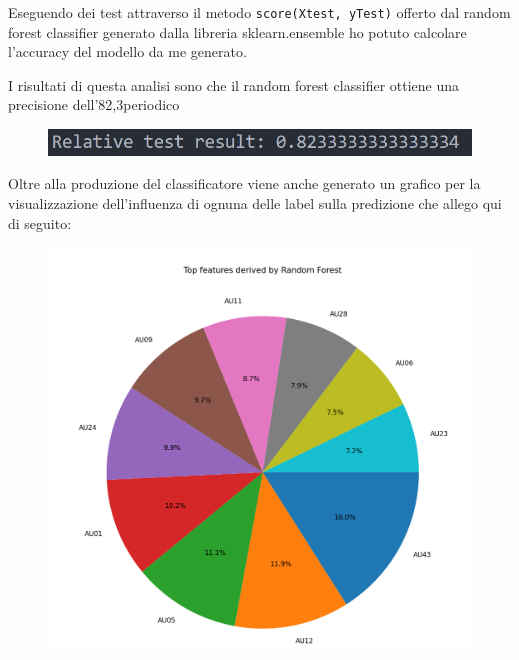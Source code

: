 Eseguendo dei test attraverso il metodo \texttt{score(Xtest, yTest)} offerto dal random forest classifier generato dalla libreria sklearn.ensemble ho potuto calcolare l’accuracy del modello da me generato.

I risultati di questa analisi sono che il random forest classifier ottiene una precisione dell’82,3periodico%

\begin{figure}
    \begin{center}    
        \includegraphics[width=0.9\linewidth]{images/image36.png}
    \end{center}
\end{figure}

Oltre alla produzione del classificatore viene anche generato un grafico per la visualizzazione dell’influenza di ognuna delle label sulla predizione che allego qui di seguito:

\begin{figure}
    \begin{center}    
        \includegraphics[width=0.9\linewidth]{images/image37.png}
    \end{center}
\end{figure}

